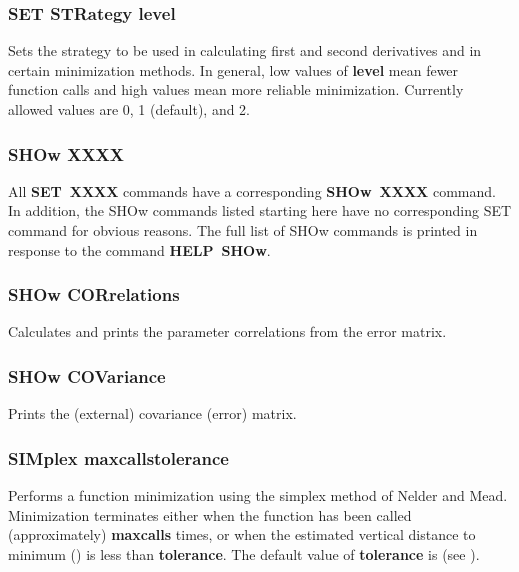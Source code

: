 \subsubsection*{SET STRategy level}

Sets the strategy to be used in calculating first and second derivatives
and in certain minimization methods. In general, low values of {\bf level}
mean fewer function calls and high values mean more reliable minimization.
Currently allowed values are 0, 1 (default), and 2.

\subsubsection*{SHOw   XXXX}

All {\bf SET~XXXX} commands have a corresponding
{\bf SHOw~XXXX} command.
In addition, the SHOw commands listed starting here have no corresponding
SET command for obvious reasons.  The full list of SHOw commands
is printed in response to the command {\bf HELP~SHOw}.

\subsubsection*{SHOw CORrelations}

Calculates and prints the parameter correlations from the error matrix.

\subsubsection*{SHOw COVariance}

Prints the (external) covariance (error) matrix.

\subsubsection*{SIMplex  \lsb maxcalls\rsb   \lsb tolerance\rsb }

Performs a function minimization using the simplex method of Nelder and
Mead. Minimization terminates either when the function has been called
(approximately) {\bf \lsb maxcalls\rsb } times,
or when the estimated vertical
distance to minimum () is less than {\bf \lsb tolerance\rsb }.
The default value of {\bf \lsb tolerance\rsb } is
 (see ).


